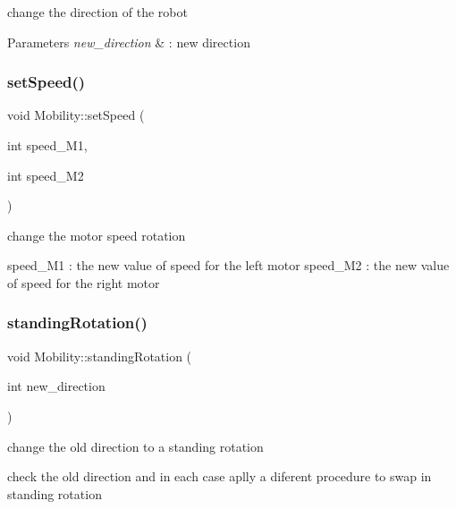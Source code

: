change the direction of the robot 


\begin{DoxyParams}{Parameters}
{\em new\+\_\+direction} & \+: new direction \\
\hline
\end{DoxyParams}
\mbox{\label{class_mobility_a781cf34ac40fc1a5a55063daa29f72a4}} 
\subsubsection{\texorpdfstring{set\+Speed()}{setSpeed()}}
{\footnotesize\ttfamily void Mobility\+::set\+Speed (\begin{DoxyParamCaption}\item[{int}]{speed\+\_\+\+M1,  }\item[{int}]{speed\+\_\+\+M2 }\end{DoxyParamCaption})}



change the motor speed rotation 

speed\+\_\+\+M1 \+: the new value of speed for the left motor  speed\+\_\+\+M2 \+: the new value of speed for the right motor \mbox{\label{class_mobility_a487708a29fef93b02a79efb466c44148}} 
\subsubsection{\texorpdfstring{standing\+Rotation()}{standingRotation()}}
{\footnotesize\ttfamily void Mobility\+::standing\+Rotation (\begin{DoxyParamCaption}\item[{int}]{new\+\_\+direction }\end{DoxyParamCaption})}



change the old direction to a standing rotation 

check the old direction and in each case aplly a diferent procedure to swap in standing rotation \mbox{\label{class_mobility_a527a6fba662394c8e2d9ac5409b4f14a}} 
